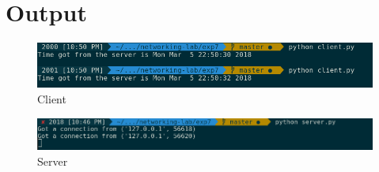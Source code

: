 \documentclass[a4paper,12pt]{article}
\begin{document}
\section{Output}

\pagebreak
\begin{figure}
	\includegraphics[width=\linewidth]{./tcp-client.png}
	\caption{Client}
	\label{fig:client}
\end{figure}

\begin{figure}
	\includegraphics[width=\linewidth]{tcp-server.png}
	\caption{Server}
	\label{fig:server}
\end{figure}
\end{document}
